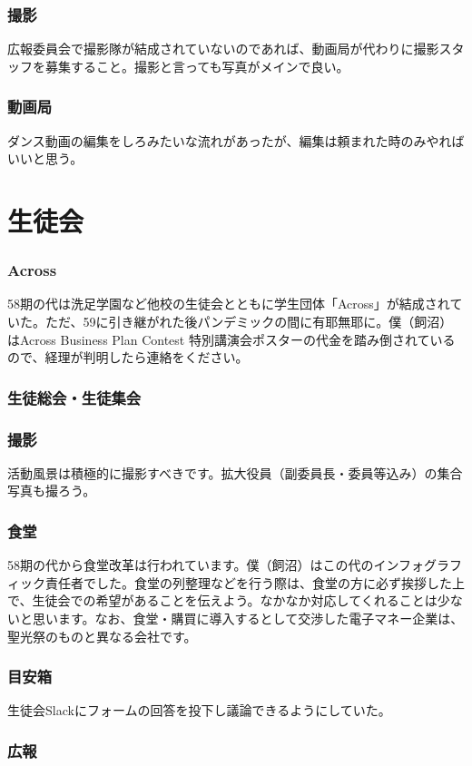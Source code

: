 \documentclass[dvipdfmx,jb5]{jarticle}
\begin{document}
\section{撮影}
広報委員会で撮影隊が結成されていないのであれば、動画局が代わりに撮影スタッフを募集すること。撮影と言っても写真がメインで良い。
\section{動画局}
ダンス動画の編集をしろみたいな流れがあったが、編集は頼まれた時のみやればいいと思う。
\part{生徒会}
\section{Across}
58期の代は洗足学園など他校の生徒会とともに学生団体「Across」が結成されていた。ただ、59に引き継がれた後パンデミックの間に有耶無耶に。僕（飼沼）はAcross Business Plan Contest 特別講演会ポスターの代金を踏み倒されているので、経理が判明したら連絡をください。

\section{生徒総会・生徒集会}
\section{撮影}
活動風景は積極的に撮影すべきです。拡大役員（副委員長・委員等込み）の集合写真も撮ろう。

\section{食堂}
58期の代から食堂改革は行われています。僕（飼沼）はこの代のインフォグラフィック責任者でした。食堂の列整理などを行う際は、食堂の方に必ず挨拶した上で、生徒会での希望があることを伝えよう。なかなか対応してくれることは少ないと思います。なお、食堂・購買に導入するとして交渉した電子マネー企業は、聖光祭のものと異なる会社です。

\section{目安箱}
生徒会Slackにフォームの回答を投下し議論できるようにしていた。
\section{広報}
\end{document}
